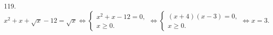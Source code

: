 119. $x^2+x+\sqrt{x}-12=\sqrt{x}\Leftrightarrow\begin{cases}x^2+x-12=0,\\ x\geqslant0.\end{cases}
\Leftrightarrow\begin{cases}(x+4)(x-3)=0,\\ x\geqslant0.\end{cases}\Leftrightarrow x=3.$\\
